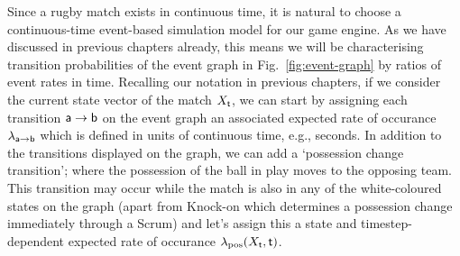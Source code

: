 Since a rugby match exists in continuous time, it is natural to choose a continuous-time event-based simulation model for our game engine. As we have discussed in previous chapters already, this means we will be characterising transition probabilities of the event graph in Fig.~\ref{fig:event-graph} by ratios of event rates in time. Recalling our notation in previous chapters, if we consider the current state vector of the match $X_{\sf t}$, we can start by assigning each transition ${\sf a}\rightarrow {\sf b}$ on the event graph an associated expected rate of occurance $\lambda_{{\sf a}\rightarrow {\sf b}}$ which is defined in units of continuous time, e.g., seconds. In addition to the transitions displayed on the graph, we can add a `possession change transition'; where the possession of the ball in play moves to the opposing team. This transition may occur while the match is also in any of the white-coloured states on the graph (apart from {\sf Knock-on} which determines a possession change immediately through a {\sf Scrum}) and let's assign this a state and timestep-dependent expected rate of occurance $\lambda_{\rm pos}(X_{\sf t}, {\sf t})$.

